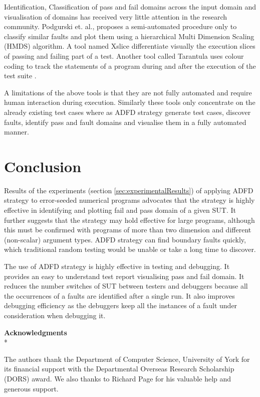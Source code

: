 \documentclass[runningheads,a4paper]{llncs}
\begin{document}
Identification, Classification of pass and fail domains across the input domain and visualisation of domains has received very little attention in the research community. Podgurski et. al., \cite{Podgurski2003} proposes a semi-automated procedure only to classify similar faults and plot them using a hierarchical Multi Dimension Scaling (HMDS) algorithm. A tool named Xslice \cite{Agrawal1995} differentiate visually the execution slices of passing and failing part of a test. Another tool called Tarantula uses colour coding to track the statements of a program during and after the execution of the test suite \cite{Jones2002}.

A limitations of the above tools is that they are not fully automated and require human interaction during execution. Similarly these tools only concentrate on the already existing test cases where as ADFD strategy generate test cases, discover faults, identify pass and fault domains and visualise them in a fully automated manner. 


\section{Conclusion} \label{sec:conclusion}

Results of the experiments (section \ref{sec:experimentalResults}) of applying ADFD strategy to error-seeded numerical programs advocates that the strategy is highly effective in identifying and plotting fail and pass domain of a given SUT. It further suggests that the strategy may hold effective for large programs, although this must be confirmed with programs of more than two dimension and different (non-scalar) argument types. ADFD strategy can find boundary faults quickly, which traditional random testing would be unable or take a long time to discover.  

The use of ADFD strategy is highly effective in testing and debugging. It provides an easy to understand test report visualising pass and fail domain. It reduces the number switches of SUT between testers and debuggers because all the occurrences of a faults are identified after a single run. It also improves debugging efficiency as the debuggers keep all the instances of a fault under consideration when debugging it.


\bigskip
\noindent\textbf{Acknowledgments} \\*

The authors thank the Department of Computer Science, University of York for its financial support with the Departmental Overseas Research Scholarship (DORS) award. We also thanks to Richard Page for his valuable help and generous support.
\end{document}
